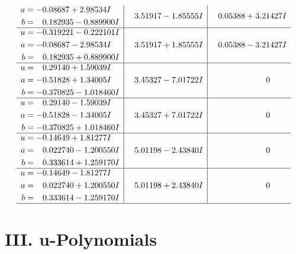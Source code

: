 \documentclass[1p]{elsarticle_modified}
\theoremstyle{definition}
\begin{document}
$$\begin{array}{c|c|c}
\begin{aligned}
a &= -0.08687 + 2.98534 I \\
b &= \phantom{-}0.182935 - 0.889900 I\end{aligned}
 & \phantom{-}3.51917 - 1.85555 I & \phantom{-}0.05388 + 3.21427 I \\ \hline\begin{aligned}
u &= -0.319221 - 0.222101 I \\
a &= -0.08687 - 2.98534 I \\
b &= \phantom{-}0.182935 + 0.889900 I\end{aligned}
 & \phantom{-}3.51917 + 1.85555 I & \phantom{-}0.05388 - 3.21427 I \\ \hline\begin{aligned}
u &= \phantom{-}0.29140 + 1.59039 I \\
a &= -0.51828 + 1.34005 I \\
b &= -0.370825 - 1.018460 I\end{aligned}
 & \phantom{-}3.45327 - 7.01722 I & \phantom{-0.000000 } 0 \\ \hline\begin{aligned}
u &= \phantom{-}0.29140 - 1.59039 I \\
a &= -0.51828 - 1.34005 I \\
b &= -0.370825 + 1.018460 I\end{aligned}
 & \phantom{-}3.45327 + 7.01722 I & \phantom{-0.000000 } 0 \\ \hline\begin{aligned}
u &= -0.14649 + 1.81277 I \\
a &= \phantom{-}0.022740 - 1.200550 I \\
b &= \phantom{-}0.333614 + 1.259170 I\end{aligned}
 & \phantom{-}5.01198 - 2.43840 I & \phantom{-0.000000 } 0 \\ \hline\begin{aligned}
u &= -0.14649 - 1.81277 I \\
a &= \phantom{-}0.022740 + 1.200550 I \\
b &= \phantom{-}0.333614 - 1.259170 I\end{aligned}
 & \phantom{-}5.01198 + 2.43840 I & \phantom{-0.000000 } 0\\
 \hline 
 \end{array}$$\newpage
\newpage\renewcommand{\arraystretch}{1}
\centering \section*{ III. u-Polynomials}
\end{document}
